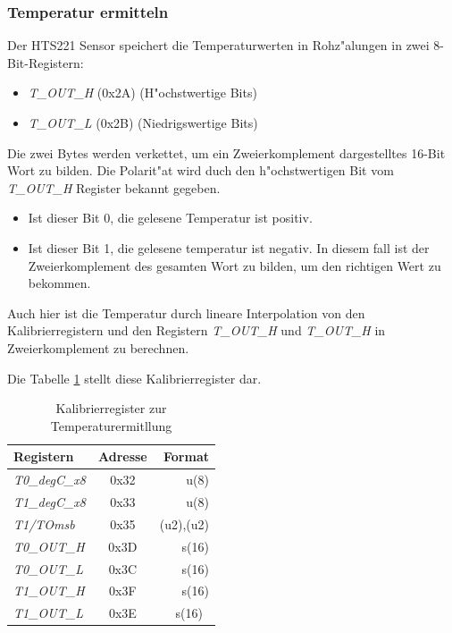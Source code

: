 \subsubsection{Temperatur ermitteln}
Der HTS221 Sensor speichert die Temperaturwerten in Rohz"alungen in 
zwei 8-Bit-Registern:

\begin{itemize}
	\item \textit{T\_OUT\_H} (0x2A) (H"ochstwertige Bits)
	\item \textit{T\_OUT\_L} (0x2B) (Niedrigswertige Bits)
\end{itemize}

Die zwei Bytes werden verkettet, um ein Zweierkomplement dargestelltes 
16-Bit Wort zu bilden. Die Polarit"at wird duch den h"ochstwertigen Bit 
vom \textit{T\_OUT\_H} Register bekannt gegeben.

\begin{itemize}
	\item Ist dieser Bit 0, die gelesene Temperatur ist positiv.
	\item Ist dieser Bit 1, die gelesene temperatur ist negativ. In 
	diesem fall ist der Zweierkomplement des gesamten Wort zu bilden, 
	um den richtigen Wert zu bekommen.
\end{itemize}

Auch hier ist die Temperatur durch lineare Interpolation von den 
Kalibrierregistern und den Registern \textit{T\_OUT\_H} und 
\textit{T\_OUT\_H} in Zweierkomplement zu berechnen.

Die Tabelle \ref{tab:Reg_T} stellt diese Kalibrierregister dar.

\begin{center}
	\begin{table}[htbp] 
		\centering 
		\Large
		\begin{tabular}{l|c|r}
			\textbf{Registern} & \textbf{Adresse} & \textbf{Format} \\
			\hline
			\textit{T0\_degC\_x8} & 0x32	& u(8) \\
			\hline
			\textit{T1\_degC\_x8} & 0x33	& u(8)\\
			\hline
			\textit{T1/TOmsb} & 0x35	& (u2),(u2)\\
			\hline
			\textit{T0\_OUT\_H} 	& 0x3D  & s(16)\\
			\hline
			\textit{T0\_OUT\_L} 	& 0x3C  & s(16)\\
			\hline
			\textit{T1\_OUT\_H}	& 0x3F	& s(16)\\
			\hline
			\textit{T1\_OUT\_L} 	& 0x3E  & s(16)\
		\end{tabular} 
		\caption{Kalibrierregister zur Temperaturermitllung} 
		\label{tab:Reg_T} 
		
	\end{table}
\end{center}

